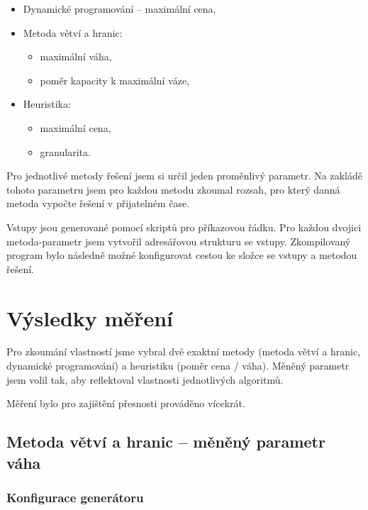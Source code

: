 \documentclass{article}
\begin{document}
\begin{itemize}
    \item Dynamické programování -- maximální cena,
    \item Metoda větví a hranic:
    \begin{itemize}
        \item maximální váha,
        \item poměr kapacity k maximální váze,
    \end{itemize}

    \item Heuristika:
    \begin{itemize}
        \item maximální cena,
        \item granularita.
    \end{itemize}
\end{itemize}

Pro jednotlivé metody řešení jsem si určil jeden proměnlivý parametr.
Na zakládě tohoto parametru jsem pro každou metodu zkoumal rozsah, pro který danná metoda vypočte řešení v přijatelném čase.

Vstupy jsou generované pomocí skriptů pro příkazovou řádku.
Pro každou dvojici metoda-parametr jsem vytvořil adresářovou strukturu se vstupy.
Zkompilovaný program bylo následně možné konfigurovat cestou ke složce se vstupy a metodou řešení.

\section{Výsledky měření}

Pro zkoumání vlastností jsme vybral dvě exaktní metody (metoda větví a hranic, dynamické programování) a heuristiku (poměr cena / váha).
Měněný parametr jsem volil tak, aby reflektoval vlastnosti jednotlivých algoritmů.


Měření bylo pro zajištění přesnosti prováděno vícekrát.

\subsection{Metoda větví a hranic -- měněný parametr váha}

\subsubsection*{Konfigurace generátoru}
\end{document}
